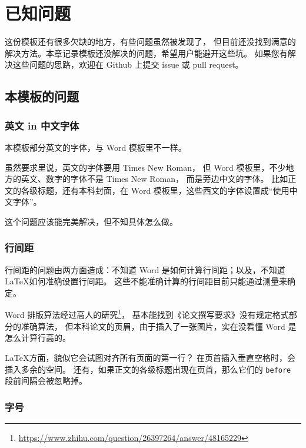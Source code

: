 \chapter{已知问题}

这份模板还有很多欠缺的地方，有些问题虽然被发现了，
但目前还没找到满意的解决方法。本章记录模板还没解决的问题，希望用户能避开这些坑。
如果您有解决这些问题的思路，欢迎在 Github 上提交 issue 或 pull request。

\section{本模板的问题}

\subsection{英文 in 中文字体}

本模板部分英文的字体，与 Word 模板里不一样。

虽然要求里说，英文的字体要用 Times New Roman\textsuperscript{\textregistered}，
但 Word 模板里，不少地方的英文、数字的字体不是 Times New Roman\textsuperscript{\textregistered}，
而是旁边中文的字体。
比如正文的各级标题，还有本科封面，在 Word 模板里，这些西文的字体设置成“使用中文字体”。

这个问题应该能完美解决，但不知具体怎么做。

\subsection{行间距}

行间距的问题由两方面造成：不知道 Word 是如何计算行间距；以及，不知道 \LaTeX 如何准确设置行间距。
这些不能准确计算的行间距目前只能通过测量来确定。


Word 排版算法经过高人的研究\footnote{\url{https://www.zhihu.com/question/26397264/answer/48165229}}，
基本能找到《论文撰写要求》没有规定格式部分的准确算法，
但本科论文的页眉，由于插入了一张图片，实在没看懂 Word 是怎么计算行高的。

\LaTeX 方面，貌似它会试图对齐所有页面的第一行？
在页首插入垂直空格时，会插入多余的空间。
还有，如果正文的各级标题出现在页首，那么它们的 \texttt{before} 段前间隔会被忽略掉。

\subsection{字号}

